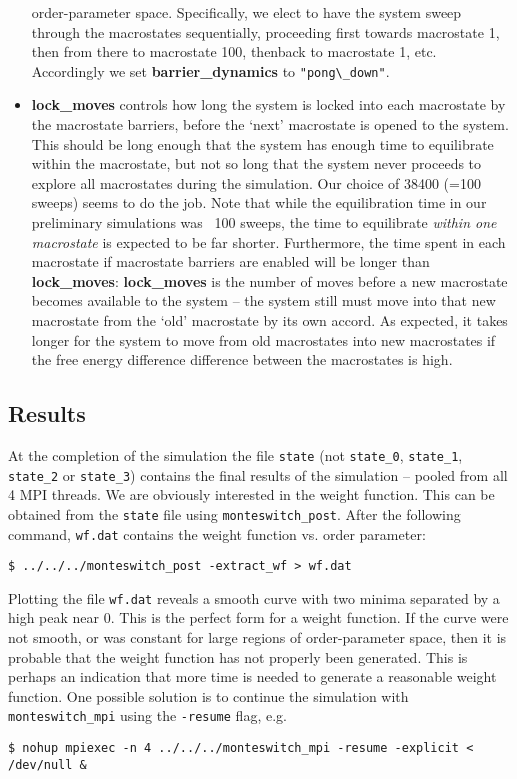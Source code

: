 \documentclass{report}
\begin{document}
\begin{itemize}
  order-parameter space.
  Specifically, we elect to have the system sweep through the macrostates sequentially, proceeding first towards macrostate 1, then from there to
  macrostate 100, thenback to macrostate 1, etc. Accordingly we set \textbf{barrier\_dynamics} to \verb|"pong\_down"|.
\item \textbf{lock\_moves} controls how long the system is locked into each macrostate by the macrostate barriers, before the `next' macrostate is 
  opened to the
  system. This should be long enough that the system has enough time to equilibrate within the macrostate, but not so long that the system never proceeds
  to explore all macrostates during the simulation. Our choice of 38400 (=100 sweeps) seems to do the job. Note that while the equilibration time in our 
  preliminary simulations was ~100 sweeps, the time to equilibrate \emph{within one macrostate} is expected to be far shorter. Furthermore, the time spent in
  each macrostate if macrostate barriers are enabled will be longer than \textbf{lock\_moves}: \textbf{lock\_moves} is the number of moves before a 
  new macrostate becomes
  available to the system -- the system still must move into that new macrostate from the `old' macrostate by its own accord. As expected, it takes
  longer for the system to move from old macrostates into new macrostates if the free energy difference difference between the macrostates is high.
\end{itemize}

\subsection{Results}
At the completion of the simulation the file \texttt{state} (not \texttt{state\_0}, \texttt{state\_1}, \texttt{state\_2} or \texttt{state\_3}) 
contains the final results of the simulation --
pooled from all 4 MPI threads. We are obviously interested in the weight function. This can be obtained from the \texttt{state} file using 
\texttt{monteswitch\_post}.
After the following command, \texttt{wf.dat} contains the weight function vs. order parameter:
\begin{verbatim}
$ ../../../monteswitch_post -extract_wf > wf.dat
\end{verbatim}
Plotting the file \texttt{wf.dat} reveals a smooth curve with two minima separated by a high peak near 0. This is the perfect form for a weight function. If the
curve were not smooth, or was constant for large regions of order-parameter space, then it is probable that the weight function has not properly been
generated. This is perhaps an indication that more time is needed to generate a reasonable weight function. One possible solution is to continue
the simulation with \texttt{monteswitch\_mpi} using the \texttt{-resume} flag, e.g.
\begin{verbatim}
$ nohup mpiexec -n 4 ../../../monteswitch_mpi -resume -explicit <
/dev/null &
\end{verbatim}
\end{document}
